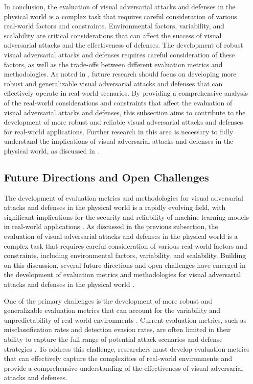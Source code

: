 \documentclass[11pt,a4paper]{article}
\begin{document}
In conclusion, the evaluation of visual adversarial attacks and defenses in the physical world is a complex task that requires careful consideration of various real-world factors and constraints. Environmental factors, variability, and scalability are critical considerations that can affect the success of visual adversarial attacks and the effectiveness of defenses. The development of robust visual adversarial attacks and defenses requires careful consideration of these factors, as well as the trade-offs between different evaluation metrics and methodologies. As noted in \cite{doi:10.1016/j.sysarc.2020.101766}, future research should focus on developing more robust and generalizable visual adversarial attacks and defenses that can effectively operate in real-world scenarios. By providing a comprehensive analysis of the real-world considerations and constraints that affect the evaluation of visual adversarial attacks and defenses, this subsection aims to contribute to the development of more robust and reliable visual adversarial attacks and defenses for real-world applications. Further research in this area is necessary to fully understand the implications of visual adversarial attacks and defenses in the physical world, as discussed in \cite{arxiv:2301.10766}.


\subsection{Future Directions and Open Challenges}


The development of evaluation metrics and methodologies for visual adversarial attacks and defenses in the physical world is a rapidly evolving field, with significant implications for the security and reliability of machine learning models in real-world applications \cite{doi:10.1109/tpami.2024.3430860}. As discussed in the previous subsection, the evaluation of visual adversarial attacks and defenses in the physical world is a complex task that requires careful consideration of various real-world factors and constraints, including environmental factors, variability, and scalability. Building on this discussion, several future directions and open challenges have emerged in the development of evaluation metrics and methodologies for visual adversarial attacks and defenses in the physical world \cite{doi:10.24963/ijcai.2021/694}. 

One of the primary challenges is the development of more robust and generalizable evaluation metrics that can account for the variability and unpredictability of real-world environments \cite{arxiv:1707.08945}. Current evaluation metrics, such as misclassification rates and detection evasion rates, are often limited in their ability to capture the full range of potential attack scenarios and defense strategies \cite{doi:10.1109/access.2018.2807385}. To address this challenge, researchers must develop evaluation metrics that can effectively capture the complexities of real-world environments and provide a comprehensive understanding of the effectiveness of visual adversarial attacks and defenses.
\end{document}
